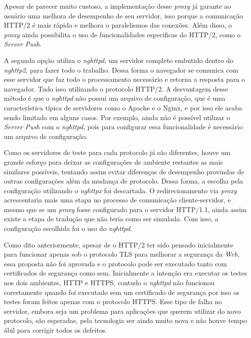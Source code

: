 Apesar de parecer muito custoso, a implementação desse \textit{proxy} já garante ao usuário uma melhora de desempenho de seu servidor, isso porque a comunicação HTTP/2 é mais rápida e melhora o paralelismos das conexões. Além disso, o \textit{proxy} ainda possibilita o uso de funcionalidades especificas do HTTP/2, como o \textit{Server Push}.

A segunda opção utiliza o \textit{nghttpd}, um servidor completo embutido dentro do \textit{nghttp2}, para fazer todo o trabalho. Dessa forma o navegador se comunica com esse servidor que faz todo o processamento necessário e retorna a resposta para o navegador. Tudo isso utilizando o protocolo HTTP/2. A desvantagem desse método é que o \textit{nghttpd} não possui um arquivo de configuração, que é uma característica típica de servidores como o Apache e o Nginx, e por isso ele acaba sendo limitado em alguns casos. Por exemplo, ainda não é possível utilizar o \textit{Server Push} com o \textit{nghttpd}, pois para configurar essa funcionalidade é necessário um arquivo de configuração.

Como os servidores de teste para cada protocolo já são diferentes, houve um grande esforço para deixar as configurações de ambiente restantes as mais similares possíveis, tentando assim evitar diferenças de desempenho provindas de outras configurações além da mudança de protocolo. Dessa forma, a escolha pela configuração utilizando o \textit{nghttpx} foi descartada. O redirecionamento via \textit{proxy} acrescentaria mais uma etapa no processo de comunicação cliente-servidor, e mesmo que se um \textit{proxy} fosse configurado para o servidor HTTP/1.1, ainda assim existe a etapa de tradução que não teria como ser simulada. Com isso, a configuração escolhida foi o uso do \textit{nghttpd}.

Como dito anteriormente, apesar de o HTTP/2 ter sido pensado inicialmente para funcionar apenas sob o protocolo TLS para melhorar a segurança da \textit{Web}, essa proposta não foi aprovada e o protocolo pode ser executado tanto com certificados de segurança como sem. Inicialmente a intenção era executar os testes nos dois ambientes, HTTP e HTTPS, contudo o \textit{nghttpd} não funcionou corretamente quando foi executado sem um certificado de segurança por isso os testes foram feitos apenas com o protocolo HTTPS. Esse tipo de falha no servidor, embora seja um problema para aplicações que querem utilizar do novo protocolo, são esperadas, pela tecnologia ser ainda muito nova e não houve tempo ábil para corrigir todos os defeitos.

